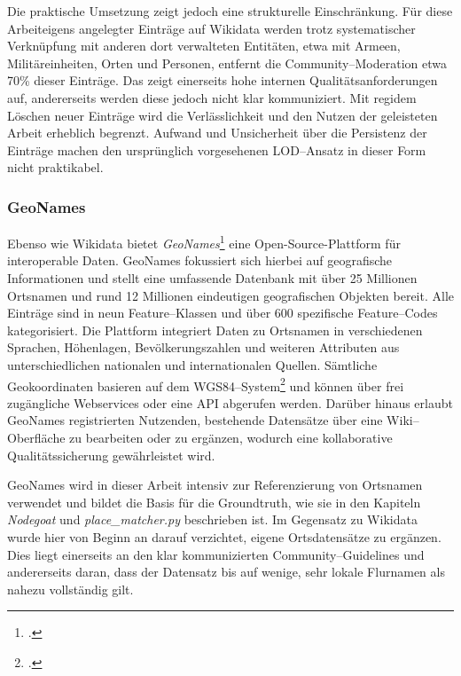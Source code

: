 \documentclass[12pt, a4paper, ngerman, bidi=default]{article}
\let\cite\footcite
\begin{document}
Die praktische Umsetzung zeigt jedoch eine strukturelle Einschränkung. Für diese Arbeiteigens angelegter Einträge auf Wikidata werden
trotz systematischer Verknüpfung mit anderen dort verwalteten Entitäten, etwa mit Armeen, Militäreinheiten, Orten und Personen, entfernt die Community–Moderation etwa 70\% dieser Einträge. 
Das zeigt einerseits hohe internen Qualitätsanforderungen auf, andererseits werden diese jedoch nicht klar kommuniziert. Mit regidem Löschen neuer Einträge wird die Verlässlichkeit und den Nutzen der 
geleisteten Arbeit erheblich begrenzt. 
Aufwand und Unsicherheit über die Persistenz der Einträge machen den ursprünglich vorgesehenen LOD–Ansatz in dieser Form nicht praktikabel.

\subsubsection{GeoNames}

Ebenso wie Wikidata bietet \textit{GeoNames}\cite[vgl.][]{noauthor_geonames_nodate} eine Open-Source-Plattform für interoperable Daten. GeoNames fokussiert sich hierbei auf geografische Informationen 
und stellt eine umfassende Datenbank mit über 25 Millionen Ortsnamen und rund 12 Millionen eindeutigen geografischen Objekten bereit.  
Alle Einträge sind in neun Feature–Klassen und über 600 spezifische Feature–Codes kategorisiert. Die Plattform integriert Daten zu 
Ortsnamen in verschiedenen Sprachen, Höhenlagen, Bevölkerungszahlen und weiteren Attributen aus unterschiedlichen nationalen und internationalen Quellen.  
Sämtliche Geokoordinaten basieren auf dem WGS84–System\footcite[\textit{WGS84: geodätische Grundlage des Global Positioning System (GPS)}; vgl.][]{noauthor_wgs84_nodate}
und können über frei zugängliche Webservices oder eine API abgerufen werden.  
Darüber hinaus erlaubt GeoNames registrierten Nutzenden, bestehende Datensätze über eine Wiki–Oberfläche zu bearbeiten oder zu ergänzen, wodurch eine 
kollaborative Qualitätssicherung gewährleistet wird.

GeoNames wird in dieser Arbeit intensiv zur Referenzierung von Ortsnamen verwendet und bildet die Basis für die Groundtruth, wie sie in den Kapiteln \textit{Nodegoat} und 
\textit{place\_matcher.py} beschrieben ist. Im Gegensatz zu Wikidata wurde hier von Beginn an darauf verzichtet, eigene Ortsdatensätze zu ergänzen. Dies liegt einerseits an 
den klar kommunizierten Community–Guidelines und andererseits daran, dass der Datensatz bis auf wenige, sehr lokale Flurnamen als nahezu vollständig gilt.
\end{document}
